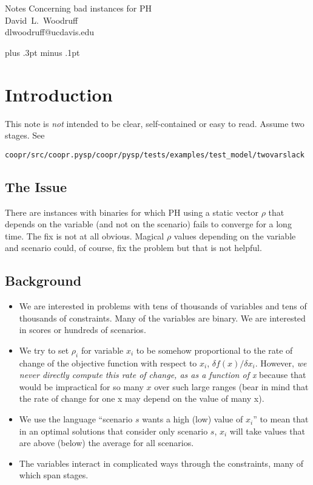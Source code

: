 \documentclass[12pt]{article}
\begin{document}
\begin{center}
  {\LARGE Notes Concerning bad instances for PH}\\[12pt]
  {\large
        \mbox{David L. Woodruff}
  }\\[12pt]
   \mbox{dlwoodruff@ucdavis.edu}
\end{center}

\baselineskip 20pt plus .3pt minus .1pt

\noindent\hrulefill

\noindent 

\noindent\hrulefill


\section{Introduction \label{sec:introduction}}

This note is {\em not} intended to be clear, self-contained or easy to
read. Assume two stages. See

\verb|coopr/src/coopr.pysp/coopr/pysp/tests/examples/test_model/twovarslack|

\subsection{The Issue}

There are instances with binaries for which PH using a static vector
$\rho$ that depends on the variable (and not on the scenario) fails to
converge for a long time. The fix is not at all obvious. Magical
$\rho$ values depending on the variable and scenario could, of course, fix the problem but that is not
helpful.

\subsection{Background}

\begin{itemize}
\item We are interested in problems with tens of thousands of variables and tens of thousands of constraints. Many of the variables are binary. We are interested in scores or hundreds of scenarios.
\item We try to set $\rho_{i}$ for variable $x_{i}$ to be somehow proportional to the rate of change of the objective function with respect to $x_{i}$, $\delta f(x)/\delta x_{i}$. However, {\em we never directly compute this rate of change, as as a function of x} because that would be impractical for so many $x$ over such large ranges (bear in mind that the rate of change for one x may depend on the value of many x).
\item We use the language ``scenario $s$ wants a high (low) value of $x_{i}$'' to mean that in an optimal solutions that consider only scenario $s$, $x_{i}$ will take values that are above (below) the average for all scenarios.
\item The variables interact in complicated ways through the constraints, many of which span stages.
\end{itemize}
\end{document}
